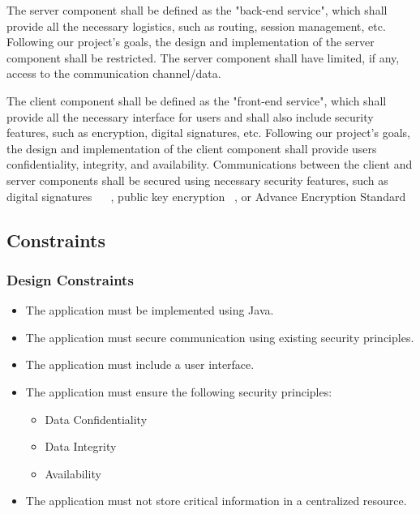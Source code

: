 \documentclass[sigconf]{acmart}
\begin{document}
The server component shall be defined as the "back-end service", which shall
provide all the necessary logistics, such as routing, session management, etc.
Following our project's goals, the design and implementation of the server
component shall be restricted. The server component shall have limited, if any,
access to the communication channel/data.

The client component shall be defined as the "front-end service", which shall
provide all the necessary interface for users and shall also include security
features, such as encryption, digital signatures, etc. Following our project's
goals, the design and implementation of the client component shall provide
users confidentiality, integrity, and availability. Communications between
the client and server components shall be secured using necessary security
features, such as digital signatures ~\cite{Fersch:provable}
~\cite{Meijer:signature}, public key encryption ~\cite{Kuchlin:publickey}, or
Advance Encryption Standard ~\cite{Jariwala:taxonomy}

\subsection{Constraints}

\subsubsection{Design Constraints}
\begin{itemize}
	\item The application must be implemented using Java.
	\item The application must secure communication using existing security
	      principles.
	\item The application must include a user interface.
	\item The application must ensure the following security principles:
	      \begin{itemize}
	      	\item Data Confidentiality
	      	\item Data Integrity
	      	\item Availability
	      \end{itemize}
	\item The application must not store critical information in a centralized
	      resource.
\end{itemize}
\end{document}

